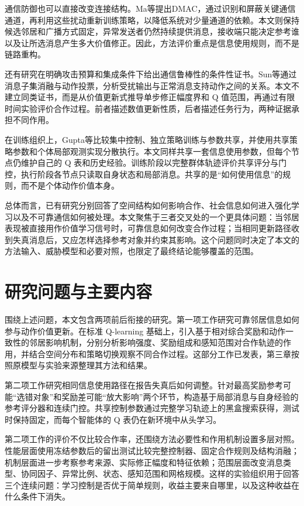 通信防御也可以直接改变连接结构。Ma等提出DMAC，通过识别和屏蔽关键通信通道，再利用这些扰动重新训练策略，以降低系统对少量通道的依赖\cite{ma2025decentralization}。本文则保持候选邻居和广播方式固定，异常发送者仍然持续提供消息，接收端只能决定参考谁以及让所选消息产生多大价值修正。因此，方法评价重点是信息使用规则，而不是链路重构。

还有研究在明确攻击预算和集成条件下给出通信鲁棒性的条件性证书。Sun等通过消息子集消融与动作投票，分析受扰输出与正常消息支持动作之间的关系\cite{sun2022certifiably}。本文不建立同类证书，而是从价值更新式推导单步修正幅度界和 Q 值范围，再通过有限时间实验评价合作过程。前者描述数值更新性质，后者描述任务行为，两种证据承担不同作用。

在训练组织上，Gupta等比较集中控制、独立策略训练与参数共享，并使用共享策略参数和个体局部观测实现分散执行\cite{gupta2017cooperative}。本文同样共享一套信息使用参数，但每个节点仍维护自己的 Q 表和历史经验。训练阶段以完整群体轨迹评价共享评分与门控，执行阶段各节点只读取自身状态和局部消息。共享的是“如何使用信息”的规则，而不是个体动作价值本身。

总体而言，已有研究分别回答了空间结构如何影响合作、社会信息如何进入强化学习以及不可靠通信如何被处理。本文聚焦于三者交叉处的一个更具体问题：当邻居表现被直接用作价值学习信号时，可靠信息如何改变合作过程；当相同更新路径收到失真消息后，又应怎样选择参考对象并约束其影响。这个问题同时决定了本文的方法输入、威胁模型和必要对照，也限定了最终结论能够覆盖的范围。

\section{研究问题与主要内容}

围绕上述问题，本文包含两项前后衔接的研究。第一项工作研究可靠邻居信息如何参与动作价值更新。在标准 Q-learning 基础上，引入基于相对综合奖励和动作一致性的邻居影响机制，分别分析影响强度、奖励组成和感知范围对合作轨迹的作用，并结合空间分布和策略切换观察不同合作过程。这部分工作已发表，第三章按照原模型与实验来源整理其方法和结果。

第二项工作研究相同信息使用路径在报告失真后如何调整。针对最高奖励参考可能“选错对象”和奖励差可能“放大影响”两个环节，构造基于局部消息与自身经验的参考评分器和连续门控。共享控制参数通过完整学习轨迹上的黑盒搜索获得，测试时保持固定，而每个智能体的 Q 表仍在新环境中从头学习。

第二项工作的评价不仅比较合作率，还围绕方法必要性和作用机制设置多层对照。性能层面使用冻结参数后的留出测试比较完整控制器、固定合作规则及结构消融；机制层面进一步考察参考来源、实际修正幅度和特征依赖；范围层面改变消息类型、协同因子、异常比例、状态、感知范围和网格规模。这样的实验组织用于回答三个连续问题：学习控制是否优于简单规则，收益主要来自哪里，以及这种收益在什么条件下消失。

